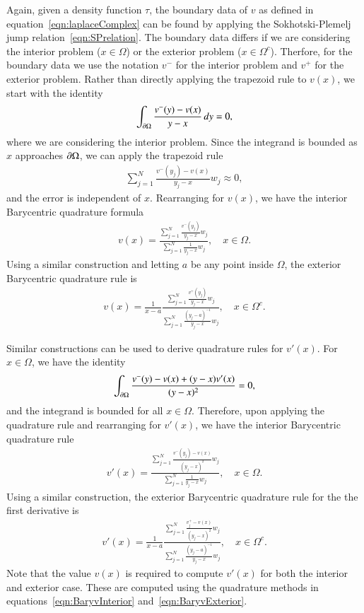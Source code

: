 \documentclass[preprint, 10pt]{elsarticle}
\begin{document}
Again, given a density function $\tau$, the boundary data of $v$ as
defined in equation~\eqref{eqn:laplaceComplex} can be found by applying
the Sokhotski-Plemelj jump relation~\eqref{eqn:SPrelation}.  The
boundary data differs if we are considering the interior problem ($x \in
\Omega$) or the exterior problem ($x \in \Omega^c$).  Therfore, for the
boundary data we use the notation $v^-$ for the interior problem and
$v^+$ for the exterior problem.  Rather than directly applying the
trapezoid rule to $v(x)$, we start with the identity
\begin{align}
  \int_{{\partial}\Omega} \frac{v^{-}(y) - v(x)}{y - x} \,dy = 0,
\end{align}
where we are considering the interior problem.  Since the integrand is
bounded as $x$ approaches ${\partial}\Omega$, we can apply the trapezoid rule
\begin{align}
  \sum_{j=1}^{N} \frac{v^{-}(y_j) - v(x)}{y_j - x} w_j \approx 0,
\end{align}
and the error is independent of $x$.  Rearranging for $v(x)$, we have
the interior Barycentric quadrature formula 
\begin{align}
  v(x) = \frac{\sum\limits_{j=1}^N \frac{v^{-}(y_j)}{y_j - x} w_j}
  {\sum\limits_{j=1}^N \frac{1}{y_j - x} w_j}, \quad x \in \Omega.
  \label{eqn:BaryvInterior}
\end{align}
Using a similar construction and letting $a$ be any point inside
$\Omega$, the exterior Barycentric quadrature rule is
\begin{align}
  v(x) = \frac{1}{x-a} 
    \frac{\sum\limits_{j=1}^N \frac{v^+(y_j)}{y_j - x}w_j}
    {\sum\limits_{j=1}^N \frac{(y_j - a)^{-1}}{y_j - x}w_j},
    \quad x \in \Omega^c.
  \label{eqn:BaryvExterior}
\end{align}

Similar constructions can be used to derive quadrature rules
for $v'(x)$.  For $x \in \Omega$, we have the identity
\begin{align}
  \int_{{\partial}\Omega} \frac{v^-(y) - v(x) + (y-x)v'(x)}{(y - x)^2} = 0,
\end{align}
and the integrand is bounded for all $x \in \Omega$.  Therefore, upon
applying the quadrature rule and rearranging for $v'(x)$, we have the
interior Barycentric quadrature rule
\begin{align}
  v'(x) = \frac{\sum\limits_{j=1}^{N}
    \frac{v^{-}(y_j) - v(x)}{(y_j-x)^2} w_j}
  {\sum\limits_{j=1}^{N} \frac{1}{y_j-x} w_j}, 
  \quad x \in \Omega.
  \label{eqn:BaryvprimeInterior}
\end{align}
Using a similar construction, the exterior Barycentric quadrature rule
for the the first derivative is
\begin{align}
  v'(x) = \frac{1}{x-a} \frac{\sum\limits_{j=1}^N
    \frac{v^+_j - v(x)}{(y_j - x)^2} w_j}
    {\sum\limits_{j=1}^N \frac{(y_j-a)^{-1}}{y_j - x} w_j},
    \quad x \in \Omega^c.
  \label{eqn:BaryvprimeExterior}
\end{align}
Note that the value $v(x)$ is required to compute $v'(x)$ for both the
interior and exterior case.  These are computed using the quadrature
methods in equations~\eqref{eqn:BaryvInterior}
and~\eqref{eqn:BaryvExterior}.
\end{document}
